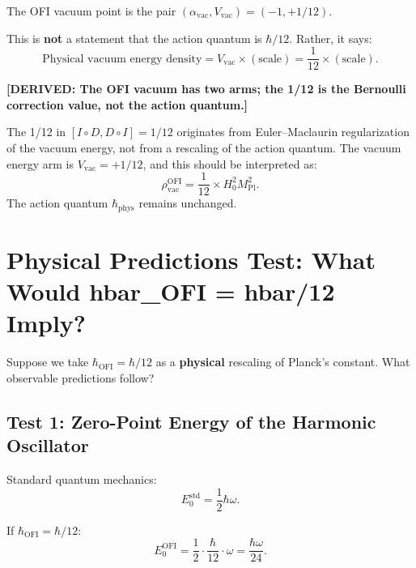 \documentclass[12pt]{article}
\theoremstyle{definition}
\newcommand{\Mpl}{M_{\mathrm{Pl}}}
\newcommand{\rhovac}{\rho_{\mathrm{vac}}}
\newcommand{\DERIVED}[1]{\textcolor{derivedcolor}{\textbf{[DERIVED: #1]}}}
\begin{document}
The OFI vacuum point is the pair $(\alpha_{\mathrm{vac}}, V_{\mathrm{vac}}) = (-1, +1/12)$.

This is \textbf{not} a statement that the action quantum is $\hbar/12$. Rather, it says:
\begin{equation}
  \text{Physical vacuum energy density} = V_{\mathrm{vac}} \times (\text{scale}) = \frac{1}{12} \times (\text{scale}).
\end{equation}

\DERIVED{The OFI vacuum has two arms; the 1/12 is the Bernoulli correction value, not
the action quantum.}

\begin{tcolorbox}[resultbox, title=Conclusion from Bernoulli Analysis]
The 1/12 in $[I\circ D, D\circ I] = 1/12$ originates from Euler--Maclaurin regularization
of the vacuum energy, not from a rescaling of the action quantum. The vacuum energy
arm is $V_{\mathrm{vac}} = +1/12$, and this should be interpreted as:
$$\rhovac^{\mathrm{OFI}} = \frac{1}{12} \times H_0^2 \Mpl^2.$$
The action quantum $\hbar_{\mathrm{phys}}$ remains unchanged.
\end{tcolorbox}

\section{Physical Predictions Test: What Would hbar_OFI = hbar/12 Imply?}
\label{sec:predictions}

Suppose we take $\hbar_{\mathrm{OFI}} = \hbar/12$ as a \textbf{physical} rescaling of
Planck's constant. What observable predictions follow?

\subsection{Test 1: Zero-Point Energy of the Harmonic Oscillator}

Standard quantum mechanics:
\begin{equation}
  E_0^{\mathrm{std}} = \frac{1}{2}\hbar \omega.
\end{equation}

If $\hbar_{\mathrm{OFI}} = \hbar/12$:
\begin{equation}
  E_0^{\mathrm{OFI}} = \frac{1}{2} \cdot \frac{\hbar}{12} \cdot \omega = \frac{\hbar\omega}{24}.
\end{equation}
\end{document}
